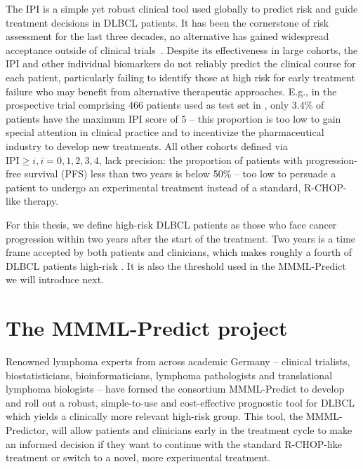 The IPI is a simple yet robust clinical tool used globally to predict risk and guide 
treatment decisions in DLBCL patients. It has been the cornerstone of risk assessment for the last 
three decades, no alternative has gained widespread acceptance outside of clinical 
trials~\citep{ipi-stay-strong}. 
Despite its effectiveness in large cohorts, the IPI and other individual 
biomarkers do not reliably predict the clinical course for each patient, particularly failing to 
identify those at high risk for early treatment failure who may benefit from alternative therapeutic 
approaches. E.g., in the prospective trial comprising \num{466} patients used as test set in 
\citep{staiger20}, only \num{3.4}\% of patients have the maximum IPI score of 5 -- this proportion 
is too low 
to gain special attention in clinical practice and to incentivize the pharmaceutical industry to 
develop new treatments. All other cohorts defined via $\text{IPI} \geq i, i = 0, 1, 2, 3, 4$, lack 
precision: the proportion of patients with progression-free survival (PFS) less than two years is below 
\num{50}\% -- too low to persuade a patient to undergo an experimental treatment instead of a 
standard, R-CHOP-like therapy.

For this thesis, we define high-risk DLBCL patients as those who face cancer progression 
within two years after the start of the treatment. Two years is a time frame accepted by both 
patients and clinicians, which makes roughly a fourth of DLBCL patients high-risk \cite{staiger20}.
It is also the threshold used in the MMML-Predict we will introduce next.

\section{The MMML-Predict project} \label{sec:intro-mmml}

Renowned lymphoma experts from across academic Germany -- clinical trialists, biostatisticians, 
bioinformaticians, lymphoma pathologists and translational lymphoma biologists -- have formed the 
consortium MMML-Predict to develop and roll out a robust, simple-to-use and cost-effective 
prognostic tool for DLBCL 
which yields a clinically more relevant high-risk group. This tool, the MMML-Predictor, will allow 
patients and clinicians early in the treatment cycle to make an informed decision if they want to 
continue with the standard R-CHOP-like treatment or switch to a novel, more experimental treatment. 

